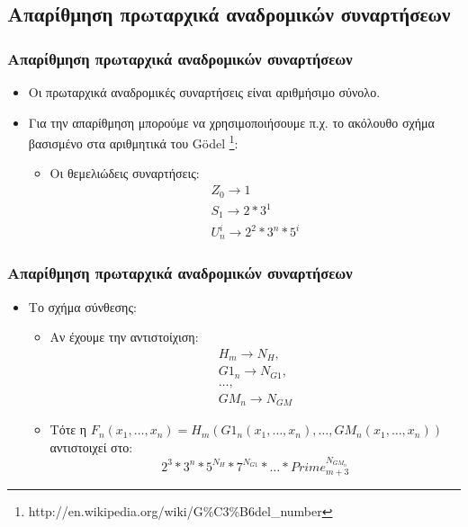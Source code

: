 \documentclass{beamer}
\begin{document}
\subsection{Απαρίθμηση πρωταρχικά αναδρομικών συναρτήσεων}

\begin{frame}
  \frametitle{Απαρίθμηση πρωταρχικά αναδρομικών συναρτήσεων}
  \begin{itemize}
  \item Οι πρωταρχικά αναδρομικές συναρτήσεις είναι αριθμήσιμο
    σύνολο. \pause
  \item Για την απαρίθμηση μπορούμε να χρησιμοποιήσουμε π.χ. το
    ακόλουθο σχήμα βασισμένο στα αριθμητικά του G\"odel
    \footnote{
      {http://en.wikipedia.org/wiki/G\%C3\%B6del_number}}:
    \begin{itemize}
    \item Οι θεμελιώδεις συναρτήσεις:
      $$
      \begin{array}{l}
        Z_0 \rightarrow 1 \\
        S_1 \rightarrow 2*3^1 \\
        U^i_n \rightarrow 2^2*3^n*5^i
      \end{array}
      $$
    \end{itemize}
  \end{itemize}
\end{frame}

\begin{frame}
  \frametitle{Απαρίθμηση πρωταρχικά αναδρομικών συναρτήσεων}
  \begin{itemize}
  \item Το σχήμα σύνθεσης:
    \begin{itemize}
    \item Αν έχουμε την αντιστοίχιση:
      $$
      \begin{array}{l}
        H_m \rightarrow N_H,\\
        G1_n \rightarrow N_{G1},\\
        \ldots,\\
        GM_n \rightarrow N_{GM}
      \end{array}
      $$
    \item Τότε η $F_n(x_1,\ldots,x_n) =
      H_m(G1_n(x_1,\ldots,x_n),\ldots,GM_n(x_1,\ldots,x_n))$
      αντιστοιχεί στο:
      $$2^3*3^n*5^{N_H}*7^{N_{G1}}*\ldots*Prime_{m+3}^{N_{GM_n}}$$
    \end{itemize}                   
  \end{itemize}
\end{frame}
\end{document}
